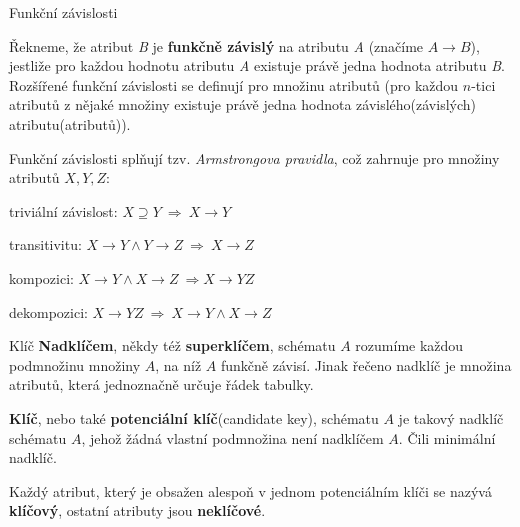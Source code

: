 \begin{definiceN}{Funkční závislosti}

\medskip\noindent
Řekneme, že atribut \emph{B} je \textbf{funkčně závislý} na atributu \emph{A}
(značíme $A\rightarrow B$), jestliže pro každou hodnotu atributu \emph{A}
existuje právě jedna hodnota atributu \emph{B}. Rozšířené funkční závislosti se definují pro množinu atributů (pro každou $n$-tici atributů z nějaké množiny existuje právě jedna hodnota závislého(závislých) atributu(atributů)).

Funkční závislosti splňují tzv. \emph{Armstrongova pravidla}, což zahrnuje pro množiny atributů $X,Y,Z$:
\begin{penumerate}
    \item triviální závislost: $X\supseteq Y\ \Rightarrow\ X\to Y$
    \item transitivitu: $X\to Y \wedge Y\to Z\ \Rightarrow\ X\to Z$
    \item kompozici: $X\to Y \wedge X\to Z\ \Rightarrow X\to YZ$
    \item dekompozici: $X\to YZ \ \Rightarrow \ X\to Y \wedge X\to Z$
\end{penumerate}
\end{definiceN}

\begin{definiceN}{Klíč}
\textbf{Nadklíčem}, někdy též \textbf{superklíčem}, schématu $A$ rozumíme každou
podmnožinu množiny $A$, na níž $A$ funkčně závisí. Jinak řečeno nadklíč je množina
atributů, která jednoznačně určuje řádek tabulky.

\textbf{Klíč}, nebo také \textbf{potenciální klíč}(candidate key), schématu $A$
je takový nadklíč schématu $A$, jehož žádná vlastní podmnožina není nadklíčem
$A$. Čili minimální nadklíč.

Každý atribut, který je obsažen alespoň v jednom potenciálním klíči se nazývá
\textbf{klíčový}, ostatní atributy jsou \textbf{neklíčové}.
\end{definiceN}

